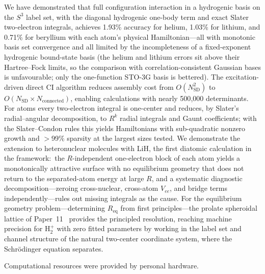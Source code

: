 \documentclass[aps,pra,twocolumn,superscriptaddress,longbibliography,floatfix]{revtex4-2}
\begin{document}
We have demonstrated that full configuration interaction in a
hydrogenic basis on the $S^3$ label set, with the diagonal hydrogenic
one-body term and exact Slater two-electron integrals, achieves
1.93\% accuracy for helium, 1.03\% for lithium, and 0.71\% for
beryllium with each atom's physical Hamiltonian---all with monotonic
basis set convergence and all limited by the incompleteness of a
fixed-exponent hydrogenic bound-state basis (the helium and lithium
errors sit above their Hartree--Fock limits, so the comparison with
correlation-consistent Gaussian bases is unfavourable; only the
one-function STO-3G basis is bettered).
The excitation-driven direct CI algorithm reduces assembly cost
from $O(N_{\text{SD}}^2)$ to $O(N_{\text{SD}} \times N_{\text{connected}})$,
enabling calculations with nearly 500{,}000 determinants.
For atoms every two-electron integral is one-center and reduces, by
Slater's radial--angular decomposition, to $R^k$ radial integrals and
Gaunt coefficients; with the Slater--Condon rules this yields
Hamiltonians with sub-quadratic nonzero growth and $>$99\% sparsity at
the largest sizes tested.
We demonstrate the extension to heteronuclear molecules with LiH,
the first diatomic calculation in the framework:\ the $R$-independent
one-electron block of each atom yields a monotonically attractive
surface with no equilibrium geometry that does not return to the
separated-atom energy at large $R$, and a systematic diagnostic
decomposition---zeroing cross-nuclear, cross-atom $V_{ee}$, and bridge
terms independently---rules out missing integrals as the cause.
For the equilibrium geometry problem---determining $R_{\mathrm{eq}}$
from first principles---the prolate spheroidal lattice of
Paper~11~\cite{loutey_paper11} provides the principled resolution,
reaching machine precision for H$_2^+$ with zero fitted parameters
by working in the label set and channel structure of the natural
two-center coordinate system, where the Schr\"odinger equation
separates.

\begin{acknowledgments}
Computational resources were provided by personal hardware.
\end{acknowledgments}
\end{document}
